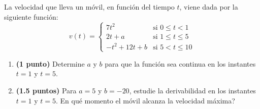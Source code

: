 
La velocidad que lleva un móvil, en función del tiempo $t$, viene dada por la siguiente función:
\[
v(t)=\begin{cases}
7t^2 & \text{si }0\leq t<1\\[4pt]
2t+a & \text{si }1\leq t\leq5\\[4pt]
-t^2+12t+b & \text{si }5<t\leq10
\end{cases}
\]
\begin{enumerate}[label=\alph*)]
\item \textbf{(1 punto)} Determine $a$ y $b$ para que la función sea continua en los instantes $t=1$ y $t=5$.
\item \textbf{(1.5 puntos)} Para $a=5$ y $b=-20$, estudie la derivabilidad en los instantes $t=1$ y $t=5$. \textquestiondown{}En qué momento el móvil alcanza la velocidad máxima?
\end{enumerate}
